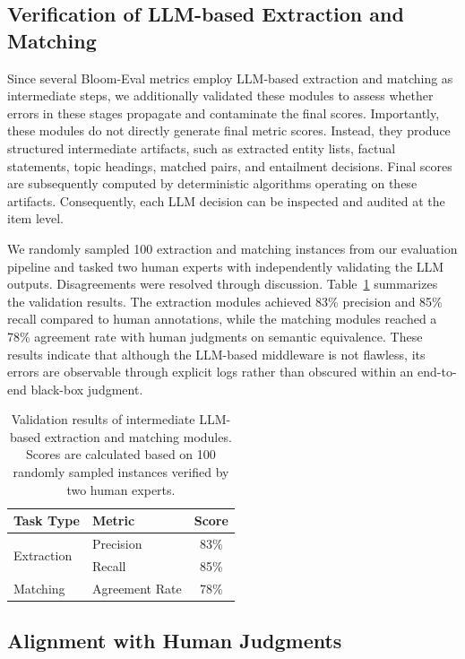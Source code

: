 \documentclass[11pt]{article}
\begin{document}
\subsection{Verification of LLM-based Extraction and Matching}
\label{sec:intermediate_llm_validation}
Since several Bloom-Eval metrics employ LLM-based extraction and matching as intermediate steps, we additionally validated these modules to assess whether errors in these stages propagate and contaminate the final scores. Importantly, these modules do not directly generate final metric scores. Instead, they produce structured intermediate artifacts, such as extracted entity lists, factual statements, topic headings, matched pairs, and entailment decisions. Final scores are subsequently computed by deterministic algorithms operating on these artifacts. Consequently, each LLM decision can be inspected and audited at the item level.

We randomly sampled 100 extraction and matching instances from our evaluation pipeline and tasked two human experts with independently validating the LLM outputs. Disagreements were resolved through discussion. Table~\ref{tab:em_validation} summarizes the validation results. The extraction modules achieved 83\% precision and 85\% recall compared to human annotations, while the matching modules reached a 78\% agreement rate with human judgments on semantic equivalence. These results indicate that although the LLM-based middleware is not flawless, its errors are observable through explicit logs rather than obscured within an end-to-end black-box judgment.

\begin{table}[ht]
\centering
\caption{Validation results of intermediate LLM-based extraction and matching modules. Scores are calculated based on 100 randomly sampled instances verified by two human experts.}
\label{tab:em_validation}
\small
\begin{tabular}{llc}
\toprule
\textbf{Task Type} & \textbf{Metric} & \textbf{Score} \\
\midrule
\multirow{2}{*}{Extraction} & Precision & 83\% \\
& Recall    & 85\% \\
\midrule
Matching           & Agreement Rate & 78\% \\
\bottomrule
\end{tabular}
\end{table}



\subsection{Alignment with Human Judgments}
\label{sec:human_correlation}
\end{document}
